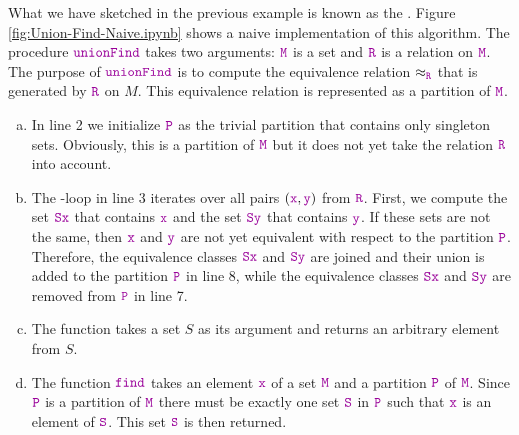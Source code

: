 What we have sketched in the previous example is known as the .
Figure \ref{fig:Union-Find-Naive.ipynb} shows a naive implementation of this algorithm.  The
procedure $\mytt{unionFind}$ takes two arguments: $\mytt{M}$ is a set and $\mytt{R}$ is a relation
on $\mytt{M}$.  The purpose of $\mytt{unionFind}$ is to compute the equivalence relation $\approx_\mytt{R}$
that is generated by $\mytt{R}$ on $M$.  This equivalence relation is represented as a partition of $\mytt{M}$.
\begin{enumerate}[(a)]
\item In line 2 we initialize $\mytt{P}$ as the trivial partition that contains only singleton
      sets.  Obviously, this is a partition of $\mytt{M}$ but it does not yet take the
      relation $\mytt{R}$ into account.
\item The -loop in line 3 iterates over all pairs $(\mytt{x},\mytt{y})$ from $\mytt{R}$.
      First, we compute the set $\mytt{Sx}$ that contains $\mytt{x}$ and the set $\mytt{Sy}$ that
      contains $\mytt{y}$.  If these sets are not the same, then $\mytt{x}$ and $\mytt{y}$ are not
      yet equivalent with respect to the partition $\mytt{P}$.  Therefore, the equivalence classes
      $\mytt{Sx}$ and $\mytt{Sy}$ are joined and their union is added to the partition 
      $\mytt{P}$ in line 8, while the equivalence classes $\mytt{Sx}$ and $\mytt{Sy}$ are
      removed from $\mytt{P}$ in line 7.
\item The function  takes a set $S$ as its argument and returns an
      arbitrary element from $S$. 
\item The function $\mytt{find}$ takes an element $\mytt{x}$ of a set $\mytt{M}$ and a partition
      $\mytt{P}$ of $\mytt{M}$.  Since $\mytt{P}$ is a partition of $\mytt{M}$ there must be exactly
      one set $\mytt{S}$ in $\mytt{P}$ such that $\mytt{x}$ is an element of $\mytt{S}$.  This set
      $\mytt{S}$ is then returned.
\end{enumerate}

